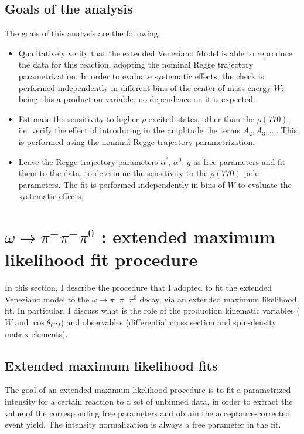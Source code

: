 \documentclass[a4paper,10pt]{report}
\newcommand{\decay}{$\omega \rightarrow \pi^+ \pi^- \pi^0$ }
\begin{document}
\section{Goals of the analysis}
The goals of this analysis are the following:
\begin{itemize}
\item Qualitatively verify that the extended Veneziano Model is able to reproduce the data for this reaction, adopting the nominal Regge trajectory parametrization. In order to evaluate systematic effects, the check is performed independently in different bins of the center-of-mass energy $W$: being this a production variable, no dependence on it is expected.
\item Estimate the sensitivity to higher $\rho$ excited states, other than the $\rho(770)$, i.e. verify the effect of introducing in the amplitude the terms $A_{2}, A_{3},\ldots$. This is performed using the nominal Regge trajectory parametrization.
\item Leave the Regge trajectory parameters $\alpha^{\prime},\, \alpha^{0},\,g $ as free parameters and fit them to the data, to determine the sensitivity to the $\rho(770)$ pole parameters. The fit is performed independently in bins of $W$ to evaluate the systematic effects.
\end{itemize}


\chapter{\decay : extended maximum likelihood fit procedure}\label{sec:fitprocedure}

In this section, I describe the procedure that I adopted to fit the extended Veneziano model to the \decay decay, via an extended maximum likelihood fit.
In particular, I discuss what is the role of the production kinematic variables ($W$ and $\cos\theta_{CM}$) and observables (differential cross section and spin-density matrix elements).

\section{Extended maximum likelihood fits}

The goal of an extended maximum likelihood procedure is to fit a parametrized intensity for a certain reaction to a set of unbinned data, in order to extract the value of the corresponding free parameters and obtain 
the acceptance-corrected event yield. The intensity normalization is always a free parameter in the fit.
\end{document}
